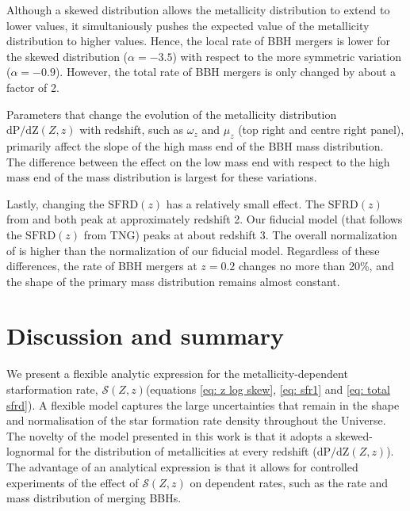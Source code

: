 \documentclass[twocolumn]{aastex631}
\newcommand{\SFRDzZ}{\ensuremath{\mathcal{S}(Z,z)}\xspace}
\newcommand{\SFRDz}{\ensuremath{\mathrm{SFRD}(z)}\xspace}
\newcommand{\dpdZ}{\ensuremath{\mathrm{dP/dZ}(Z,z)}\xspace}
\begin{document}
Although a skewed distribution allows the metallicity distribution to extend to lower values, it simultaniously pushes the expected value of the metallicity distribution to higher values. Hence, the local rate of BBH mergers is lower for the skewed distribution ($\alpha = -3.5$) with respect to the more symmetric variation ($\alpha = -0.9$). However, the total rate of BBH mergers is only changed by about a factor of 2. 


Parameters that change the evolution of the metallicity distribution \dpdZ with redshift, such as $\omega_z$ and $\mu_z$ (top right and centre right panel), primarily affect the slope of the high mass end of the BBH mass distribution.
The difference between the effect on the low mass end with respect to the high mass end of the mass distribution is largest for these variations.


Lastly, changing the \SFRDz has a relatively small effect. 
The \SFRDz from \cite{Madau+2017} and \cite{Neijssel+2019} both peak at approximately redshift 2. Our fiducial model (that follows the \SFRDz from TNG) peaks at about redshift 3. The overall normalization of \cite{Neijssel+2019} is higher than the normalization of our fiducial model. Regardless of these differences, the rate of BBH mergers at $z=0.2$ changes no more than 20\%, and the shape of the primary mass distribution remains almost constant. 







\section{Discussion and summary \label{sec: summary}}

We present a flexible analytic expression for the metallicity-dependent starformation rate, \SFRDzZ (equations \ref{eq: z log skew}, \ref{eq: sfr1} and \ref{eq: total sfrd}). A flexible model captures the large uncertainties that remain in the shape and normalisation of the star formation rate density throughout the Universe. 
The novelty of the model presented in this work is that it adopts a skewed-lognormal for the distribution of metallicities at every redshift (\dpdZ). The advantage of an analytical expression is that it allows for controlled experiments of the effect of \SFRDzZ on dependent rates, such as the rate and mass distribution of merging BBHs. 
\end{document}
